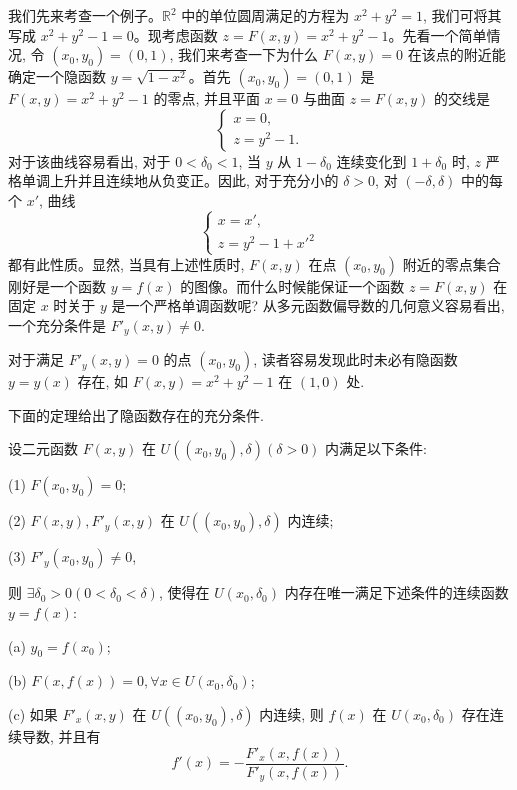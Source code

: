 我们先来考查一个例子。$\mathbb R^2$ 中的单位圆周满足的方程为 $x^2+y^2=1$, 我们可将其写成 $x^2+y^2-1=0$。现考虑函数 $z=F(x,y)=x^2+y^2-1$。先看一个简单情况, 令 $(x_0,y_0)=(0,1)$, 我们来考查一下为什么 $F(x,y)=0$ 在该点的附近能确定一个隐函数 $y=\sqrt{1-x^2}$。首先 $(x_0,y_0)=(0,1)$ 是 $F(x,y)=x^2+y^2-1$ 的零点, 并且平面 $x=0$ 与曲面 $z=F(x,y)$ 的交线是
\[
  \begin{cases}
    x=0,\\
    z=y^2-1.
  \end{cases}
\]
对于该曲线容易看出, 对于 $0<\delta_0<1$, 当 $y$ 从 $1-\delta_0$ 连续变化到 $1+\delta_0$ 时, $z$ 严格单调上升并且连续地从负变正。因此, 对于充分小的 $\delta>0$, 对 $(-\delta,\delta)$ 中的每个 $x'$, 曲线
\[
  \begin{cases}
    x=x',\\
    z=y^2-1+x'^2
  \end{cases}
\]
都有此性质。显然, 当具有上述性质时, $F(x,y)$ 在点 $(x_0,y_0)$ 附近的零点集合刚好是一个函数 $y=f(x)$ 的图像。而什么时候能保证一个函数 $z=F(x,y)$ 在固定 $x$ 时关于 $y$ 是一个严格单调函数呢? 从多元函数偏导数的几何意义容易看出, 一个充分条件是 $F'_y(x,y)\ne0$.

对于满足 $F'_y(x,y)=0$ 的点 $(x_0,y_0)$, 读者容易发现此时未必有隐函数 $y=y(x)$ 存在, 如 $F(x,y)=x^2+y^2-1$ 在 $(1,0)$ 处.

下面的定理给出了隐函数存在的充分条件.

\begin{theorem}[{隐函数存在定理}]\label{theorem:ma-14-4-1}
设二元函数 $F(x,y)$ 在 $U((x_0,y_0),\delta)(\delta>0)$ 内满足以下条件:

(1) $F(x_0,y_0)=0$;

(2) $F(x,y),F'_y(x,y)$ 在 $U((x_0,y_0),\delta)$ 内连续;

(3) $F'_y(x_0,y_0)\ne0$,

则 $\exists\delta_0>0(0<\delta_0<\delta)$, 使得在 $U(x_0,\delta_0)$ 内存在唯一满足下述条件的连续函数 $y=f(x)$:

(a) $y_0=f(x_0)$;

(b) $F(x,f(x))=0,\forall x\in U(x_0,\delta_0)$;

(c) 如果 $F'_x(x,y)$ 在 $U((x_0,y_0),\delta)$ 内连续, 则 $f(x)$ 在 $U(x_0,\delta_0)$ 存在连续导数, 并且有
\[
  f'(x)=-\frac{F'_x(x,f(x))}{F'_y(x,f(x))}.
\]
\end{theorem}


